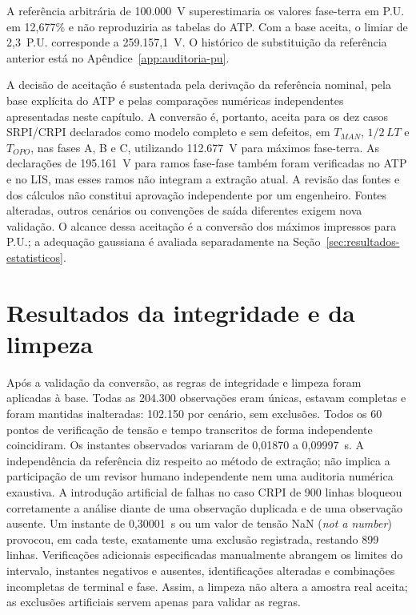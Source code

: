 \documentclass[
	12pt,				%
	openright,			%
	oneside,			%
	a4paper,			%
	chapter=TITLE,		%
	section=TITLE,		%
	subsection=TITLE,	%
	subsubsection=TITLE,%
	english,			%
	brazilian			%
	]{abntex2}
\theoremstyle{definition}
\begin{document}
A referência arbitrária de 100.000~V superestimaria os valores fase-terra
em P.U. em 12,677\% e não reproduziria as tabelas do ATP. Com a base aceita,
o limiar de 2,3~P.U. corresponde a 259.157,1~V. O histórico de substituição
da referência anterior está no Apêndice~\ref{app:auditoria-pu}.

A decisão de aceitação é sustentada pela derivação da referência
nominal, pela base explícita do ATP e pelas comparações numéricas
independentes apresentadas neste capítulo.
A conversão é, portanto, aceita para os dez casos SRPI/CRPI declarados como
modelo completo e sem defeitos, em $T_{MAN}$, $1/2\,LT$ e $T_{OPO}$, nas fases
A, B e C, utilizando 112.677~V para máximos fase-terra. As declarações de
195.161~V para ramos fase-fase também foram verificadas no ATP e no LIS, mas
esses ramos não integram a extração atual. A revisão das fontes e dos
cálculos não constitui aprovação independente por um engenheiro.
Fontes alteradas, outros cenários ou convenções de saída
diferentes exigem nova validação. O alcance dessa aceitação é a conversão
dos máximos impressos para P.U.; a adequação gaussiana é avaliada
separadamente na Seção~\ref{sec:resultados-estatisticos}.

\section{Resultados da integridade e da limpeza}

Após a validação da conversão, as regras de integridade e limpeza foram
aplicadas à base. Todas as 204.300 observações eram únicas, estavam
completas e foram mantidas
inalteradas: 102.150 por cenário, sem exclusões. Todos os 60 pontos de
verificação de tensão e tempo transcritos de forma independente coincidiram.
Os instantes observados variaram de 0,01870 a 0,09997~s. A independência da
referência diz respeito ao método de extração; não implica a participação de
um revisor humano independente nem uma auditoria numérica exaustiva.
A introdução artificial de falhas no caso CRPI de 900 linhas bloqueou
corretamente a análise diante de uma observação duplicada e de uma observação
ausente. Um instante de 0,30001~s ou um valor de tensão NaN (\textit{not a number}) provocou, em cada
teste, exatamente uma exclusão registrada, restando 899 linhas. Verificações
adicionais especificadas manualmente abrangem os limites do intervalo,
instantes negativos e ausentes, identificações alteradas e combinações
incompletas de terminal e fase. Assim, a limpeza não altera a amostra real
aceita; as exclusões artificiais servem apenas para validar as regras.
\end{document}

